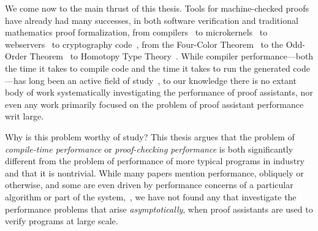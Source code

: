 We come now to the main thrust of this thesis.
Tools for machine-checked proofs have already had many successes, in both software verification and traditional mathematics proof formalization, from compilers~\cite{Compcert} to microkernels~\cite{seL4SOSP09} to webservers~\cite{Network2015Chlipala} to cryptography code~\cite{FiatCryptoSP19}, from the Four-Color Theorem~\cite{gonthier2008formal} to the Odd-Order Theorem~\cite{gonthier2013machine} to Homotopy Type Theory~\cite{HoTTBook}.
While compiler performance---both the time it takes to compile code and the time it takes to run the generated code---has long been an active field of study~\cite{CC++Performance2017,georges2007statistically,mytkowicz-wrong-data}, to our knowledge there is no extant body of work systematically investigating the performance of proof assistants, nor even any work primarily focused on the problem of proof assistant performance writ large.

Why is this problem worthy of study?
This thesis argues that the problem of \emph{compile-time performance} or \emph{proof-checking performance} is both significantly different from the problem of performance of more typical programs in industry and that it is nontrivial.
While many papers mention performance, obliquely or otherwise, and some are even driven by performance concerns of a particular algorithm or part of the system,~\cites[p.~1382]{gonthier2008formal}{Efficiency1994Boulton}{Proving2005Benjamin}{Idris2Faster2020Brady}{Recognizing1989Benanav}{mechanical1990Pierce}{CelikETAL17iCoq}{PalmskogETAL18piCoq}{Gregoire-Leroy-02}{thesis-nogin}{Idris2Faster2020Brady}, we have not found any that investigate the performance problems that arise \emph{asymptotically}, when proof assistants are used to verify programs at large scale.

